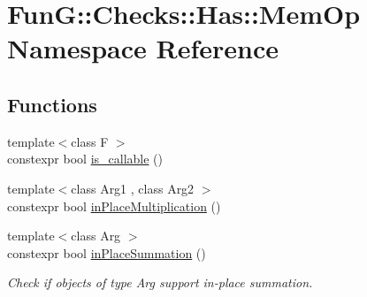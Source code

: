 \hypertarget{namespaceFunG_1_1Checks_1_1Has_1_1MemOp}{\section{Fun\-G\-:\-:Checks\-:\-:Has\-:\-:Mem\-Op Namespace Reference}
\label{namespaceFunG_1_1Checks_1_1Has_1_1MemOp}
}
\subsection*{Functions}
\begin{DoxyCompactItemize}
\item 
{\footnotesize template$<$class F $>$ }\\constexpr bool \hyperlink{namespaceFunG_1_1Checks_1_1Has_1_1MemOp_a5810c07eff37faaf76b881548a6722bd}{is\-\_\-callable} ()
\item 
{\footnotesize template$<$class Arg1 , class Arg2 $>$ }\\constexpr bool \hyperlink{namespaceFunG_1_1Checks_1_1Has_1_1MemOp_ae8e502928ebc6342cab98ebbb62b8802}{in\-Place\-Multiplication} ()
\item 
{\footnotesize template$<$class Arg $>$ }\\constexpr bool \hyperlink{namespaceFunG_1_1Checks_1_1Has_1_1MemOp_a23052f7d8da399943f6354a7d477c825}{in\-Place\-Summation} ()
\begin{DoxyCompactList}\small\item\em Check if objects of type Arg support in-\/place summation. \end{DoxyCompactList}\end{DoxyCompactItemize}



